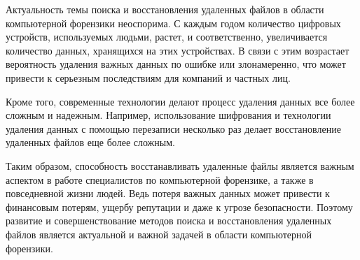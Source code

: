 Актуальность темы поиска и восстановления удаленных файлов в области компьютерной форензики неоспорима. С каждым годом количество цифровых устройств, используемых людьми, растет, и соответственно, увеличивается количество данных, хранящихся на этих устройствах. В связи с этим возрастает вероятность удаления важных данных по ошибке или злонамеренно, что может привести к серьезным последствиям для компаний и частных лиц.

Кроме того, современные технологии делают процесс удаления данных все более сложным и надежным. Например, использование шифрования и технологии удаления данных с помощью перезаписи несколько раз делает восстановление удаленных файлов еще более сложным.

Таким образом, способность восстанавливать удаленные файлы является важным аспектом в работе специалистов по компьютерной форензике, а также в повседневной жизни людей. Ведь потеря важных данных может привести к финансовым потерям, ущербу репутации и даже к угрозе безопасности. Поэтому развитие и совершенствование методов поиска и восстановления удаленных файлов является актуальной и важной задачей в области компьютерной форензики.

